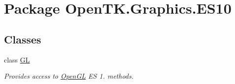 \hypertarget{namespace_open_t_k_1_1_graphics_1_1_e_s10}{\section{Package Open\-T\-K.\-Graphics.\-E\-S10}
\label{namespace_open_t_k_1_1_graphics_1_1_e_s10}
}
\subsection*{Classes}
\begin{DoxyCompactItemize}
\item 
class \hyperlink{class_open_t_k_1_1_graphics_1_1_e_s10_1_1_g_l}{G\-L}
\begin{DoxyCompactList}\small\item\em Provides access to \hyperlink{namespace_open_t_k_1_1_graphics_1_1_open_g_l}{Open\-G\-L} E\-S 1. methods. \end{DoxyCompactList}\end{DoxyCompactItemize}
